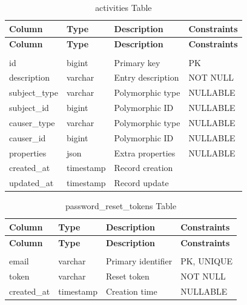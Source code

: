 \renewcommand{\arraystretch}{1.3}
\begin{longtable}{|p{3cm}|p{3cm}|p{4cm}|p{3cm}|}
    \hline
    \textbf{Column} & \textbf{Type} & \textbf{Description} & \textbf{Constraints} \\
    \hline
    \endfirsthead
    \hline
    \textbf{Column} & \textbf{Type} & \textbf{Description} & \textbf{Constraints} \\
    \hline
    \endhead
    \hline
    \endfoot
    \hline
    \caption{activities Table} \label{tab:activities} \\
    \endlastfoot
    id & bigint & Primary key & PK \\
    \hline
    description & varchar & Entry description & NOT NULL \\
    \hline
    subject\_type & varchar & Polymorphic type & NULLABLE \\
    \hline
    subject\_id & bigint & Polymorphic ID & NULLABLE \\
    \hline
    causer\_type & varchar & Polymorphic type & NULLABLE \\
    \hline
    causer\_id & bigint & Polymorphic ID & NULLABLE \\
    \hline
    properties & json & Extra properties & NULLABLE \\
    \hline
    created\_at & timestamp & Record creation & \\
    \hline
    updated\_at & timestamp & Record update & \\
    \hline
\end{longtable}

\renewcommand{\arraystretch}{1.3}
\begin{longtable}{|p{3cm}|p{3cm}|p{4cm}|p{3cm}|}
    \hline
    \textbf{Column} & \textbf{Type} & \textbf{Description} & \textbf{Constraints} \\
    \hline
    \endfirsthead
    \hline
    \textbf{Column} & \textbf{Type} & \textbf{Description} & \textbf{Constraints} \\
    \hline
    \endhead
    \hline
    \endfoot
    \hline
    \caption{password\_reset\_tokens Table} \label{tab:password_reset} \\
    \endlastfoot
    email & varchar & Primary identifier & PK, UNIQUE \\
    \hline
    token & varchar & Reset token & NOT NULL \\
    \hline
    created\_at & timestamp & Creation time & NULLABLE \\
    \hline
\end{longtable}

